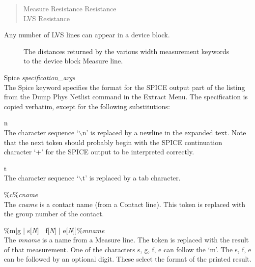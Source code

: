 \begin{description}
\begin{quote}\rr\vt
Measure Resistance Resistance\\
LVS Resistance\\
\end{quote}

Any number of {\et LVS} lines can appear in a device block.

\begin{figure}
\caption{\label{devmeas} The distances returned by the various width
measurement keywords to the device block {\et Measure} line.}
\vspace{1.5ex}
\begin{center}
\end{center}
\end{figure}

\item{\et Spice} {\it specification\_args}\\
The {\et Spice} keyword specifies the format for the SPICE output part
of the listing from the {\cb Dump Phys Netlist} command in the {\cb
Extract Menu}.  The specification is copied verbatim, except for the
following substitutions:

\begin{description}
\item{\et {$\backslash$}n}\\
The character sequence `{$\backslash$}n' is replaced by a newline in the
expanded text.  Note that the next token should probably begin with
the SPICE continuation character `+' for the SPICE output to be
interpreted correctly.

\item{\et {$\backslash$}t}\\
The character sequence `{$\backslash$}t' is replaced by a tab character.

\item{\et \%c\%}{\it cname}\\
The {\it cname} is a contact name (from a {\et Contact} line).  This
token is replaced with the group number of the contact.

\item{\et \%m[g {\vt |} s[{\it N\/}] {\vt |} f[{\it N\/}] {\vt |}
     e[{\it N\/}]]\%}{\it mname}\\
The {\it mname} is a name from a {\et Measure} line.  The
token is replaced with the result of that measurement.
One of the characters s, g, f, e can follow the `m'.  The s, f, e
can be followed by an optional digit.  These select the format of
the printed result.


\end{description}
\end{description}
